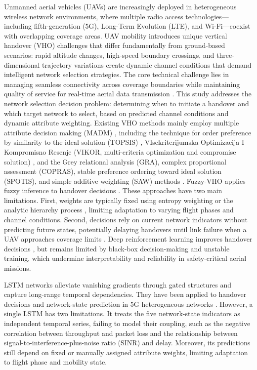 \documentclass[final,3p,times,twocolumn]{elsarticle}
\begin{document}
Unmanned aerial vehicles (UAVs) are increasingly deployed in heterogeneous wireless network environments, where multiple radio access technologies—including fifth-generation (5G), Long-Term Evolution (LTE), and Wi-Fi—coexist with overlapping coverage areas. UAV mobility introduces unique vertical handover (VHO) challenges that differ fundamentally from ground-based scenarios: rapid altitude changes, high-speed boundary crossings, and three-dimensional trajectory variations create dynamic channel conditions that demand intelligent network selection strategies. The core technical challenge lies in managing seamless connectivity across coverage boundaries while maintaining quality of service for real-time aerial data transmission \cite{ref1,ref2,ref3}. This study addresses the network selection decision problem: determining when to initiate a handover and which target network to select, based on predicted channel conditions and dynamic attribute weighting. Existing VHO methods mainly employ multiple attribute decision making (MADM) \cite{ref7}, including the technique for order preference by similarity to the ideal solution (TOPSIS) \cite{ref8,ref9,ref10}, VIsekriterijumska Optimizacija I Kompromisno Resenje (VIKOR, multi-criteria optimization and compromise solution) \cite{ref11}, and the Grey relational analysis (GRA), complex proportional assessment (COPRAS), stable preference ordering toward ideal solution (SPOTIS), and simple additive weighting (SAW) methods \cite{ref12}. Fuzzy-VHO applies fuzzy inference to handover decisions \cite{ref4}. These approaches have two main limitations. First, weights are typically fixed using entropy weighting or the analytic hierarchy process \cite{ref12,ref13,ref14,ref15}, limiting adaptation to varying flight phases and channel conditions. Second, decisions rely on current network indicators without predicting future states, potentially delaying handovers until link failure when a UAV approaches coverage limits \cite{ref16,ref17}. Deep reinforcement learning improves handover decisions \cite{ref16,ref17,ref18}, but remains limited by black-box decision-making and unstable training, which undermine interpretability and reliability in safety-critical aerial missions.

LSTM networks alleviate vanishing gradients through gated structures \cite{ref19} and capture long-range temporal dependencies. They have been applied to handover decisions and network-state prediction in 5G heterogeneous networks \cite{ref20,ref21,ref22}. However, a single LSTM has two limitations. It treats the five network-state indicators as independent temporal series, failing to model their coupling, such as the negative correlation between throughput and packet loss and the relationship between signal-to-interference-plus-noise ratio (SINR) and delay. Moreover, its predictions still depend on fixed or manually assigned attribute weights, limiting adaptation to flight phase and mobility state.
\end{document}
